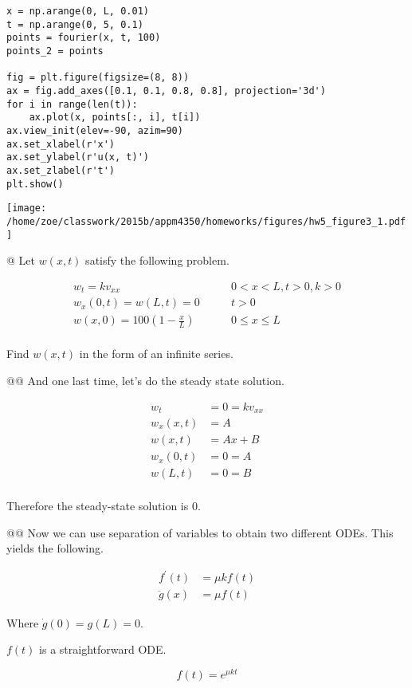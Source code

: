 \documentclass[10pt]{article}
\begin{document}
\begin{easylist}[enumerate]
\begin{verbatim}
x = np.arange(0, L, 0.01)
t = np.arange(0, 5, 0.1)
points = fourier(x, t, 100)
points_2 = points

fig = plt.figure(figsize=(8, 8))
ax = fig.add_axes([0.1, 0.1, 0.8, 0.8], projection='3d')
for i in range(len(t)):
    ax.plot(x, points[:, i], t[i])
ax.view_init(elev=-90, azim=90)
ax.set_xlabel(r'x')
ax.set_ylabel(r'u(x, t)')
ax.set_zlabel(r't')
plt.show()
\end{verbatim}
\texttt{[image: /home/zoe/classwork/2015b/appm4350/homeworks/figures/hw5\_figure3\_1.pdf]}

\noweave

    \newpage
    @ Let $w(x, t)$ satisfy the following problem.

    \begin{align*}
        w_t = kv_{xx} \qquad & 0 < x < L, t > 0, k > 0\\
        w_x(0, t) = w(L, t) = 0 \qquad & t > 0\\
        w(x, 0) = 100 \left( 1 - \frac{x}{L} \right) \qquad & 0 \le x \le L\\
    \end{align*}

    Find $w(x, t)$ in the form of an infinite series.

    @@ And one last time, let's do the steady state solution.

    \begin{align*}
        w_t &= 0 = kv_{xx}\\
        w_x(x, t) &= A\\
        w(x, t) &= Ax + B\\
        w_x(0, t) &= 0 = A\\
        w(L, t) &= 0 = B\\
    \end{align*}

    Therefore the steady-state solution is $0$.

    @@ Now we can use separation of variables to obtain two different ODEs. This yields the following.

    \begin{align*}
        f^\prime(t) &= \mu k f(t)\\
        \ddot{g}(x) &= \mu f(t)
    \end{align*}

    Where $\dot{g}(0) = g(L) = 0$.

    $f(t)$ is a straightforward ODE.

    \[
        f(t) = e^{\mu k t}
    \]


\end{easylist}
\end{document}
